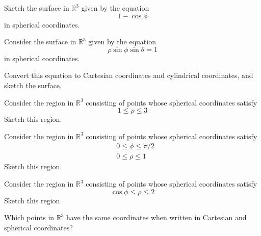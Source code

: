 \documentclass{ximera}
\begin{document}
\begin{problem}
Sketch the surface in $\mathbb{R}^3$ given by the equation
\[
1-\cos\phi
\]
in spherical coordinates.
\end{problem}

\begin{problem}
Consider the surface in $\mathbb{R}^3$ given by the equation
\[
\rho\sin\phi\sin\theta = 1
\]
in spherical coordinates.

Convert this equation to Cartesian coordinates and cylindrical coordinates, and sketch the surface.
\end{problem}

\begin{problem}
Consider the region in $\mathbb{R}^3$ consisting of points whose spherical coordinates satisfy
\[
1\leq\rho\leq 3
\]
Sketch this region.
\end{problem}

\begin{problem}
Consider the region in $\mathbb{R}^3$ consisting of points whose spherical coordinates satisfy
\begin{align*}
&0\leq \phi\leq \pi/2\\
&0\leq \rho\leq 1
\end{align*}
Sketch this region.
\end{problem}

\begin{problem}
Consider the region in $\mathbb{R}^3$ consisting of points whose spherical coordinates satisfy
\[
\cos\phi \leq \rho \leq 2
\]
Sketch this region.
\end{problem}

\begin{problem}
\begin{problem}
Which points in $\mathbb{R}^3$ have the same coordinates when written in Cartesian and spherical coordinates?
\end{problem}
\end{problem}
\end{document}
